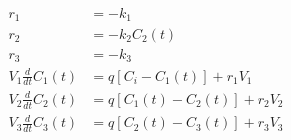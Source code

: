 \begin{equation}
  \begin{aligned}
    r_1                    & = - k_1
    \\
    r_2                    & = - k_2 C_2(t)
    \\
    r_3                    & = - k_3
    \\
    V_1 \frac{d}{dt}C_1(t) & = q [C_i - C_1(t)] + r_1 V_1
    \\
    V_2 \frac{d}{dt}C_2(t) & = q [C_1(t) - C_2(t)] + r_2 V_2
    \\
    V_3 \frac{d}{dt}C_3(t) & = q [C_2(t) - C_3(t)] + r_3 V_3
  \end{aligned}
  \label{eq:three_stirred_tank02_2}
\end{equation}